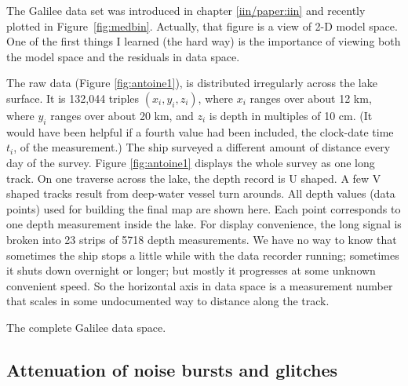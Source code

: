 \par
The Galilee data set was introduced in chapter \ref{iin/paper:iin}
and recently plotted in Figure~\ref{fig:medbin}.
Actually, that figure is a view of 2-D model space.
One of the first things I learned (the hard way) is the importance
of viewing both the model space and the residuals in data space.
\par
{}

\par
The raw data (Figure \ref{fig:antoine1}),
is distributed irregularly across the lake surface.
It is 132,044 triples $(x_i,y_i,z_i)$, where $x_i$ ranges over about 
12 km, where $y_i$ ranges over about 20 km,
and $z_i$ is depth in multiples of 10 cm.
(It would have been helpful if a fourth value had been included,
the clock-date time $t_i$, of the measurement.)
The ship surveyed a different amount of distance every day of the survey.
Figure \ref{fig:antoine1} displays the whole survey as one long track.
On one traverse across the lake, the depth record is U shaped.
A few V shaped tracks result from deep-water vessel turn arounds.
All depth values (data points) used for building the final map are shown here.
Each point corresponds to one depth measurement inside the lake.
For display convenience, the long signal is broken
into 23 strips of 5718 depth measurements.
We have no way to know that sometimes the ship stops a little while
with the data recorder running;
sometimes it shuts down overnight or longer;
but mostly it progresses at some unknown convenient speed.
So the horizontal axis in data space is a measurement number
that scales in some undocumented way to distance along the track.

 {
  The complete Galilee data space.}


\subsection{Attenuation of noise bursts and glitches}


